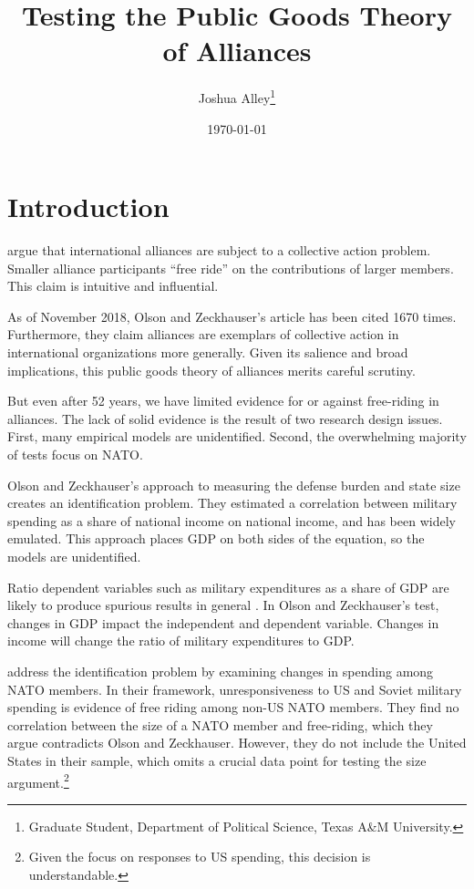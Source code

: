 \documentclass[12pt]{article}
\title{
\textbf{Testing the Public Goods Theory of Alliances}
	}
\author{Joshua Alley\footnote{Graduate Student,
Department of Political Science, Texas A\&M University.}}
\date{{\normalsize \today}}
\begin{document}
\maketitle 

\doublespace



\section{Introduction}



\citet{OlsonZeckhauser1966} argue that international alliances are subject to a collective action problem. 
Smaller alliance participants ``free ride'' on the contributions of larger members. 
This claim is intuitive and influential. 


As of November 2018, Olson and Zeckhauser's article has been cited 1670 times.
Furthermore, they claim alliances are exemplars of collective action in international organizations more generally. 
Given its salience and broad implications, this public goods theory of alliances merits careful scrutiny. 


But even after 52 years, we have limited evidence for or against free-riding in alliances. 
The lack of solid evidence is the result of two research design issues. 
First, many empirical models are unidentified.
Second, the overwhelming majority of tests focus on NATO. 


Olson and Zeckhauser's approach to measuring the defense burden and state size creates an identification problem. 
They estimated a correlation between military spending as a share of national income on national income, and has been widely emulated. 
This approach places GDP on both sides of the equation, so the models are unidentified.


Ratio dependent variables such as military expenditures as a share of GDP are likely to produce spurious results in general \citep{Kronmal1993}. 
In Olson and Zeckhauser's test, changes in GDP impact the independent and dependent variable. 
Changes in income will change the ratio of military expenditures to GDP. 


\citet{PluemperNeumayer2015} address the identification problem by examining changes in spending among NATO members. 
In their framework, unresponsiveness to US and Soviet military spending is evidence of free riding among non-US NATO members.
They find no correlation between the size of a NATO member and free-riding, which they argue contradicts Olson and Zeckhauser. 
However, they do not include the United States in their sample, which omits a crucial data point for testing the size argument.\footnote{Given the focus on responses to US spending, this decision is understandable.}
\end{document}
